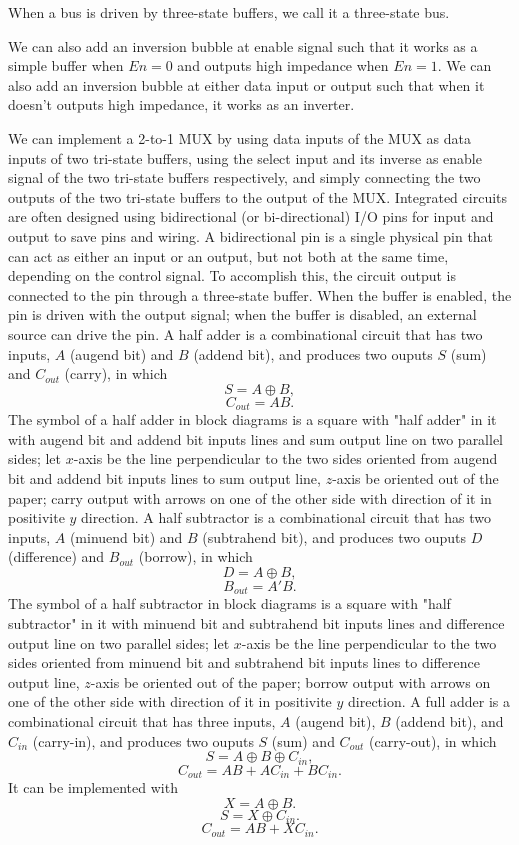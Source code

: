 \documentclass[a4paper,12pt]{report}
\begin{document}
When a bus is driven by three-state buffers, we call it a three-state bus.

We can also add an inversion bubble at enable signal such that it works as a simple buffer when $En=0$ and outputs high impedance when $En=1$. We can also add an inversion bubble at either data input or output such that when it doesn't outputs high impedance, it works as an inverter.

We can implement a 2-to-1 MUX by using data inputs of the MUX as data inputs of two tri-state buffers, using the select input and its inverse as enable signal of the two tri-state buffers respectively, and simply connecting the two outputs of the two tri-state buffers to the output of the MUX.
Integrated circuits are often designed using bidirectional (or bi-directional) I/O pins for input and output to save pins and wiring. A bidirectional pin is a single physical pin that can act as either an input or an output, but not both at the same time, depending on the control signal. To accomplish this, the circuit output is connected to the pin through a three-state buffer. When the buffer is enabled, the pin is driven with the output signal; when the buffer is disabled, an external source can drive the pin.
A half adder is a combinational circuit that has two inputs, $A$ (augend bit) and $B$ (addend bit), and produces two ouputs $S$ (sum) and $C_{out}$ (carry), in which
\[S=A\oplus B,\]
\[C_{out}=AB.\]
The symbol of a half adder in block diagrams is a square with "half adder" in it with augend bit and addend bit inputs lines and sum output line on two parallel sides; let $x$-axis be the line perpendicular to the two sides oriented from augend bit and addend bit inputs lines to sum output line, $z$-axis be oriented out of the paper; carry output with arrows on one of the other side with direction of it in positivite $y$ direction.
A half subtractor is a combinational circuit that has two inputs, $A$ (minuend bit) and $B$ (subtrahend bit), and produces two ouputs $D$ (difference) and $B_{out}$ (borrow), in which
\[D=A\oplus B,\]
\[B_{out}=A'B.\]
The symbol of a half subtractor in block diagrams is a square with "half subtractor" in it with minuend bit and subtrahend bit inputs lines and difference output line on two parallel sides; let $x$-axis be the line perpendicular to the two sides oriented from minuend bit and subtrahend bit inputs lines to difference output line, $z$-axis be oriented out of the paper; borrow output with arrows on one of the other side with direction of it in positivite $y$ direction.
A full adder is a combinational circuit that has three inputs, $A$ (augend bit), $B$ (addend bit), and $C_{in}$ (carry-in), and produces two ouputs $S$ (sum) and $C_{out}$ (carry-out), in which
\[S=A\oplus B\oplus C_{in},\]
\[C_{out}=AB+AC_{in}+BC_{in}.\]
It can be implemented with
\[X=A\oplus B.\]
\[S=X\oplus C_{in}.\]
\[C_{out}=AB+XC_{in}.\]
\end{document}

